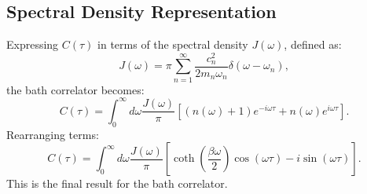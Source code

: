 \subsection{Spectral Density Representation}
\label{subsec:spectral_density}

Expressing \( C(\tau) \) in terms of the spectral density \( J(\omega) \), defined as:
\begin{equation} \label{eq:spectral_density}
J(\omega) = \pi \sum_{n=1}^{\infty} \frac{c_n^2}{2 m_n \omega_n} \delta(\omega - \omega_n),
\end{equation}
the bath correlator becomes:
\begin{equation} \label{eq:correlator_spectral_density}
C(\tau) = \int_0^\infty d\omega \frac{J(\omega)}{\pi} \left[ (n(\omega) + 1) e^{-i \omega \tau} + n(\omega) e^{i \omega \tau} \right].
\end{equation}
Rearranging terms:
\begin{equation} \label{eq:correlator_final}
C(\tau) = \int_0^\infty d\omega \frac{J(\omega)}{\pi} \left[ \coth\left( \frac{\beta \omega}{2} \right) \cos(\omega \tau) - i \sin(\omega \tau) \right].
\end{equation}
This is the final result for the bath correlator.
